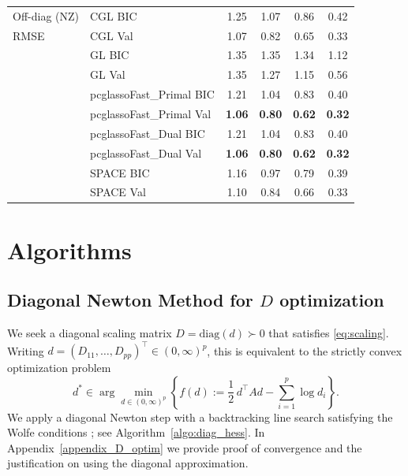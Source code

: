 \documentclass[12pt]{amsart}
\numberwithin{equation}{section}
\numberwithin{equation}{section}
\theoremstyle{plain}
\theoremstyle{definition}
\begin{document}
\begin{longtable}[]{@{}llcccc@{}}
\midrule\noalign{}
Off-diag (NZ) & CGL BIC & 1.25 & 1.07 & 0.86 & 0.42 \\
RMSE & CGL Val & 1.07 & 0.82 & 0.65 & 0.33 \\
 & GL BIC & 1.35 & 1.35 & 1.34 & 1.12 \\
 & GL Val & 1.35 & 1.27 & 1.15 & 0.56 \\
 & pcglassoFast\_Primal BIC & 1.21 & 1.04 & 0.83 & 0.40 \\
 & pcglassoFast\_Primal Val & \textbf{1.06} & \textbf{0.80} & \textbf{0.62} & \textbf{0.32} \\
 & pcglassoFast\_Dual BIC & 1.21 & 1.04 & 0.83 & 0.40 \\
 & pcglassoFast\_Dual Val & \textbf{1.06} & \textbf{0.80} & \textbf{0.62} & \textbf{0.32} \\
 & SPACE BIC & 1.16 & 0.97 & 0.79 & 0.39 \\
 & SPACE Val & 1.10 & 0.84 & 0.66 & 0.33 \\

\end{longtable}









\section{Algorithms}\label{appendix:algs}

\subsection{Diagonal Newton Method for \texorpdfstring{$D$}{D} optimization}\label{sec:optD}

We seek a diagonal scaling matrix $D=\mathrm{diag}(d)\succ 0$ that satisfies \eqref{eq:scaling}.
Writing $d=(D_{11},\ldots,D_{pp})^\top\in(0,\infty)^p$, this is equivalent to the strictly convex optimization problem
\[
d^\ast \in \arg\min_{d\in(0,\infty)^p}
\left\{ f(d):=\frac12\, d^\top A d - \sum_{i=1}^p \log d_i \right\}.
\]
 We apply a diagonal Newton step with a backtracking
line search satisfying the Wolfe conditions \cite[Algorithm~3.5]{Nocedal2006}; see Algorithm~\ref{algo:diag_hess}. In Appendix~\ref{appendix_D_optim} we provide proof of convergence and the justification on using the diagonal approximation.
\end{document}
